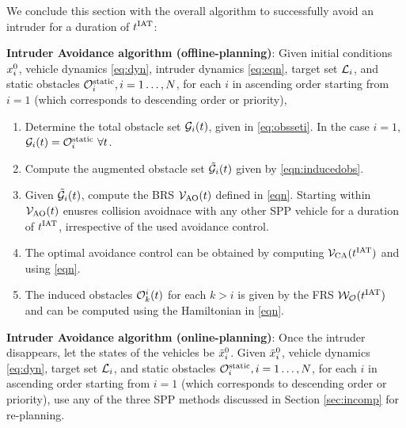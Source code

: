 We conclude this section with the overall algorithm to successfully avoid an intruder for a duration of $t^\text{IAT}$: 
\begin{alg}
\label{alg:intruder}
\textbf{Intruder Avoidance algorithm (offline-planning)}: Given initial conditions $x_i^0$, vehicle dynamics \eqref{eq:dyn}, intruder dynamics \eqref{eq:eqn}, target set $\mathcal{L}_i$, and static obstacles $\mathcal{O}^\text{static}_i, i = 1\ldots, N$, for each $i$ in ascending order starting from $i=1$ (which corresponds to descending order or priority),
\begin{enumerate}
\item Determine the total obstacle set $\mathcal{G}_i(t)$, given in \eqref{eq:obsseti}. In the case $i=1$, $\mathcal{G}_i(t) = \mathcal{O}^\text{static}_i ~ \forall t$.
\item Compute the augmented obstacle set $\tilde{\mathcal{G}}_i(t)$ given by \eqref{eqn:inducedobs}.
\item Given $\tilde{\mathcal{G}}_i(t)$, compute the BRS $\mathcal{V}_{\text{AO}}(t)$ defined in \eqref{eqn}. Starting within $\mathcal{V}_{\text{AO}}(t)$ enusres collision avoidnace with any other SPP vehicle for a duration of $t^\text{IAT}$, irrespective of the used avoidance control. 
\item The optimal avoidance control can be obtained by computing $\mathcal{V}_{\text{CA}}(t^\text{IAT})$ and using \eqref{eqn}. 
\item The induced obstacles $\mathcal{O}_k^i(t)$ for each $k>i$ is given by the FRS $\mathcal{W}_{\mathcal{O}}(t^\text{IAT})$ and can be computed using the Hamiltonian in \eqref{eqn}.
\end{enumerate}

\textbf{Intruder Avoidance algorithm (online-planning)}: Once the intruder disappears, let the states of the vehicles be $\tilde{x}_i^0$. Given $\tilde{x}_i^0$, vehicle dynamics \eqref{eq:dyn}, target set $\mathcal{L}_i$, and static obstacles $\mathcal{O}^\text{static}_i, i = 1\ldots, N$, for each $i$ in ascending order starting from $i=1$ (which corresponds to descending order or priority), use any of the three SPP methods discussed in Section \ref{sec:incomp} for re-planning. 
\end{alg}